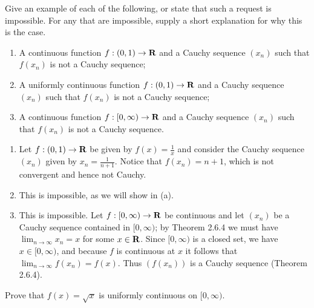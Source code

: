 \documentclass{lew98_solutions}
\begin{document}
\begin{exercise}
\label{ex:4.4.6}
    Give an example of each of the following, or state that such a request is impossible. For any that are impossible, supply a short explanation for why this is the case.
    \begin{enumerate}
        \item A continuous function \( f : (0, 1) \to \mathbf{R} \) and a Cauchy sequence \( (x_n) \) such that \( f(x_n) \) is not a Cauchy sequence;

        \item A uniformly continuous function \( f : (0, 1) \to \mathbf{R} \) and a Cauchy sequence \( (x_n) \) such that \( f(x_n) \) is not a Cauchy sequence;

        \item A continuous function \( f : [0, \infty) \to \mathbf{R} \) and a Cauchy sequence \( (x_n) \) such that \( f(x_n) \) is not a Cauchy sequence.
    \end{enumerate}
\end{exercise}

\begin{solution}
    \begin{enumerate}
        \item Let \( f : (0, 1) \to \mathbf{R} \) be given by \( f(x) = \tfrac{1}{x} \) and consider the Cauchy sequence \( (x_n) \) given by \( x_n = \tfrac{1}{n+1} \). Notice that \( f(x_n) = n + 1 \), which is not convergent and hence not Cauchy.

        \item This is impossible, as we will show in  (a).

        \item This is impossible. Let \( f : [0, \infty) \to \mathbf{R} \) be continuous and let \( (x_n) \) be a Cauchy sequence contained in \( [0, \infty) \); by Theorem 2.6.4 we must have \( \lim_{n \to \infty} x_n = x \) for some \( x \in \mathbf{R} \). Since \( [0, \infty) \) is a closed set, we have \( x \in [0, \infty) \), and because \( f \) is continuous at \( x \) it follows that \( \lim_{n \to \infty} f(x_n) = f(x) \). Thus \( (f(x_n)) \) is a Cauchy sequence (Theorem 2.6.4).
    \end{enumerate}
\end{solution}

\begin{exercise}
\label{ex:4.4.7}
    Prove that \( f(x) = \sqrt{x} \) is uniformly continuous on \( [0, \infty) \).
\end{exercise}
\end{document}
